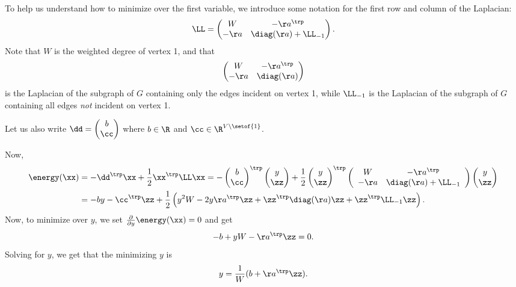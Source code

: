 To help us understand how to minimize over the first variable, we
introduce some notation for the first row and column of the Laplacian:
\begin{equation}
  \label{eq:lapuniformlayout}
  \LL =
\begin{pmatrix}
W & -\aa^\trp \\
-\aa& \diag(\aa) + \LL_{-1}
\end{pmatrix}.
\end{equation}
Note that $W$ is the weighted degree of vertex 1, and that
\begin{equation}
\begin{pmatrix}
W & -\aa^\trp \\
-\aa& \diag(\aa)
\end{pmatrix}
\end{equation}
is the Laplacian of the subgraph of $G$ containing only the edges incident on
vertex 1, while $\LL_{-1}$ is the Laplacian of the subgraph of $G$
containing all edges \emph{not} incident on vertex 1.

Let us also write $\dd =
\begin{pmatrix}
  b \\ \cc
\end{pmatrix}$ where $b \in \R$ and $\cc \in \R^{V \setminus
  \setof{1}}$.

Now,
\begin{align*}
  \energy(\xx)
  &=
  -\dd^\trp\xx +
  \frac{1}{2}\xx^\trp\LL\xx
  =
  -\begin{pmatrix}
  b \\ \cc
\end{pmatrix}^\trp \begin{pmatrix}
  y \\ \zz
\end{pmatrix}
+
  \frac{1}{2}\begin{pmatrix}
  y \\ \zz
\end{pmatrix}^\trp
\left(
\begin{array}{ccc}
W & -\aa^\trp \\
-\aa& \diag(\aa) + \LL_{-1}
\end{array} \right)
\begin{pmatrix}
  y \\ \zz
\end{pmatrix}
  \\
  &=
    - by  -\cc^\trp\zz
    +
    \frac{1}{2}
    \left(
    y^2 W - 2 y \aa^\trp \zz
    +
    \zz^\trp \diag(\aa) \zz
    +
    \zz^\trp \LL_{-1} \zz
    \right).
\end{align*}
Now, to minimize over $y$, we set $\frac{\partial  }{\partial  y}
\energy(\xx) = 0$ and get
\[
    - b
    +
    y W - \aa^\trp \zz
    = 0
   .
  \]
  Solving for $y$, we get that the minimizing $y$ is
\begin{equation}
\label{eq:laponevarmin}
y = \frac{1}{W}(b + \aa^\trp \zz).
\end{equation}

